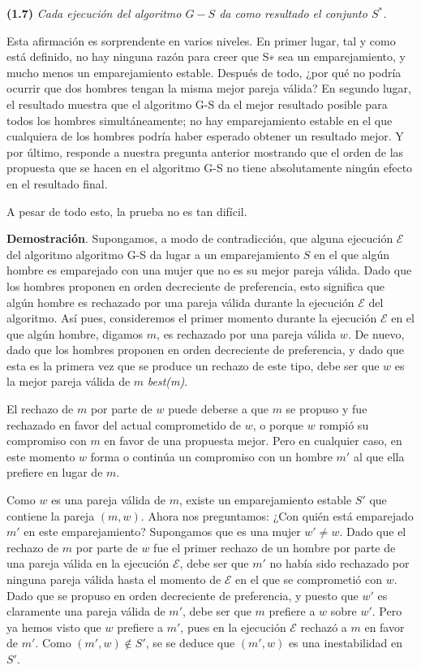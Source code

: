 \documentclass[a4paper, 12pt]{book}
\begin{document}
\vspace{2mm}\noindent
\colorbox{mygray}{\parbox{\textwidth}{
\textbf{(1.7)} \textit{Cada ejecución del algoritmo $G-S$ da como resultado el conjunto $S^*$.}}}
\vspace{2mm}

Esta afirmación es sorprendente en varios niveles. En primer lugar, tal y como está definido, no hay ninguna razón para creer que S∗ sea un emparejamiento, y mucho menos un emparejamiento estable. Después de todo, ¿por qué no podría ocurrir que dos hombres tengan la misma mejor pareja válida? En segundo lugar, el resultado muestra que el algoritmo G-S da el mejor resultado posible para todos los hombres simultáneamente; no hay emparejamiento estable en el que cualquiera de los hombres podría haber esperado obtener un resultado mejor. Y por último, responde a nuestra pregunta anterior mostrando que el orden de las propuesta que se hacen en el algoritmo G-S no tiene absolutamente ningún efecto en el resultado final.

A pesar de todo esto, la prueba no es tan difícil.

\textbf{Demostración}. 
Supongamos, a modo de contradicción, que alguna ejecución $\mathcal{E}$ del algoritmo algoritmo G-S da lugar a un emparejamiento $S$ en el que algún hombre es emparejado con una mujer que no es su mejor pareja válida. Dado que los hombres proponen en orden decreciente de preferencia, esto significa que algún hombre es rechazado por una pareja válida durante la ejecución $\mathcal{E}$ del algoritmo. Así pues, consideremos el primer momento durante la ejecución $\mathcal{E}$ en el que algún hombre, digamos $m$, es rechazado por una pareja válida $w$. De nuevo, dado que los hombres proponen en orden decreciente de preferencia, y dado que esta es la primera vez que se produce un rechazo de este tipo, debe ser que $w$ es la mejor pareja válida de $m$ \textit{best(m)}. 

El rechazo de $m$ por parte de $w$ puede deberse a que $m$ se propuso y fue rechazado en favor del actual comprometido de $w$, o porque $w$ rompió su compromiso con $m$ en favor de una propuesta mejor. Pero en cualquier caso, en este momento $w$ forma o continúa un compromiso con un hombre $m'$ al que ella prefiere en lugar de $m$.

Como $w$ es una pareja válida de $m$, existe un emparejamiento estable $S'$ que contiene la pareja $(m, w)$. 
Ahora nos preguntamos: ¿Con quién está emparejado $m'$ en este emparejamiento? Supongamos que es una mujer $w' \neq w$. 
Dado que el rechazo de $m$ por parte de $w$ fue el primer rechazo de un hombre por parte de una pareja válida en la ejecución $\mathcal{E}$, debe ser que $m'$ no había sido rechazado por ninguna pareja válida hasta el momento de $\mathcal{E}$ en el que se comprometió con $w$. 
Dado que se propuso en orden decreciente de preferencia, y puesto que $w'$ es claramente una pareja válida de $m'$, debe ser que $m$ prefiere a $w$ sobre $w'$. 
Pero ya hemos visto que $w$ prefiere a $m'$, pues en la ejecución $\mathcal{E}$ rechazó a $m$ en favor de $m'$. Como $(m', w) \notin S'$, se se deduce que $(m', w)$ es una inestabilidad en $S'$. 
\end{document}
